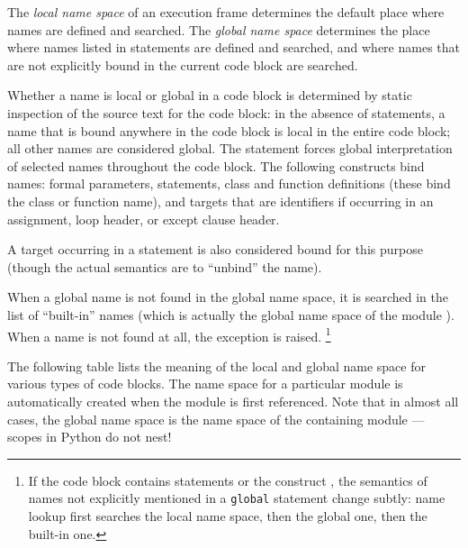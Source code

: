The {\em local name space} of an execution frame determines the default
place where names are defined and searched.  The {\em global name
space} determines the place where names listed in 
statements are defined and searched, and where names that are not
explicitly bound in the current code block are searched.

Whether a name is local or global in a code block is determined by
static inspection of the source text for the code block: in the
absence of  statements, a name that is bound anywhere in
the code block is local in the entire code block; all other names are
considered global.  The  statement forces global
interpretation of selected names throughout the code block.  The
following constructs bind names: formal parameters, 
statements, class and function definitions (these bind the class or
function name), and targets that are identifiers if occurring in an
assignment,  loop header, or except clause header.

A target occurring in a  statement is also considered bound
for this purpose (though the actual semantics are to ``unbind'' the
name).

When a global name is not found in the global name space, it is
searched in the list of ``built-in'' names (which is actually the
global name space of the module ).  When a name is not
found at all, the  exception is raised.%
\footnote{If the code block contains  statements or the
construct , the semantics of names not
explicitly mentioned in a {\tt global} statement change subtly: name
lookup first searches the local name space, then the global one, then
the built-in one.}

The following table lists the meaning of the local and global name
space for various types of code blocks.  The name space for a
particular module is automatically created when the module is first
referenced.  Note that in almost all cases, the global name space is
the name space of the containing module --- scopes in Python do not
nest!

